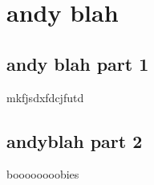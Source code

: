 \section{andy blah}
\subsection{andy blah part 1}
mkfjsdxfdcjfutd

\subsection{andyblah part 2}
boooooooobies